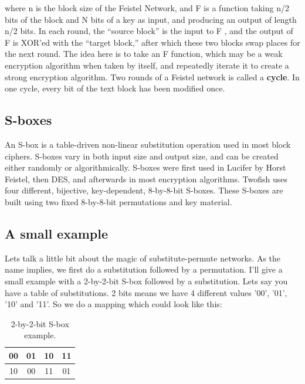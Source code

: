 where n is the block size of the Feistel Network, and F is a function taking n/2 bits of the block and N bits of a key as input, and producing an output of length n/2 bits. In each round, the “source block” is the input to F , and the output of F is XOR'ed with the “target block,” after which these two blocks swap places for the next round. The idea here is to take an F function, which may be a weak encryption algorithm when taken by itself, and repeatedly iterate it to create a strong encryption algorithm.  Two rounds of a Feistel network is called a \textbf{cycle}. In one cycle, every bit of the text block has been modified once.

\subsection{S-boxes}
An S-box is a table-driven non-linear substitution operation used in most block ciphers. S-boxes vary in both input size and output size, and can be created either randomly or algorithmically. S-boxes were first used in Lucifer by Horst Feistel, then DES, and afterwards in most encryption algorithms. Twofish uses four different, bijective, key-dependent, 8-by-8-bit S-boxes. These S-boxes are built using two fixed 8-by-8-bit permutations and key material.

\subsection{A small example}
Lets talk a little bit about the magic of substitute-permute networks. As the name implies, we first do a substitution followed by a permutation. I'll give a small example with a 2-by-2-bit S-box followed by a substitution.
Lets say you have a table of substitutions. 2 bits means we have 4 different values '00', '01', '10' and '11'.
So we do a mapping which could look like this:
\begin{table}[htp]
  \begin{center}
    \label{fig:small_subs_example}
    \begin{tabular}{|c|c|c|c|}
      \hline
      00 & 01 & 10 & 11 \\ \hline
      10 & 00 & 11 & 01 \\ \hline
    \end{tabular}
    \caption{2-by-2-bit S-box example.}
  \end{center}
\end{table}


